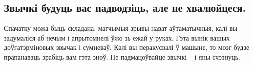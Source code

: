 \subsection{Звычкі будуць вас падводзіць, але не хвалюйцеся.}
Спачатку можа быць складана, магчымыя зрывы нават аўтаматычныя, калі вы задумаліся аб нечым і апрытомнелі ўжо зь ежай у руках. Гэта вынік вашых доўгатэрміновых звычак і сумневаў. Калі вы перакусвалі ў машыне, то мозг будзе прапанаваць зрабіць вам гэта зноў. Не падмацоўвайце звычкі – і яны счэзнуць.
